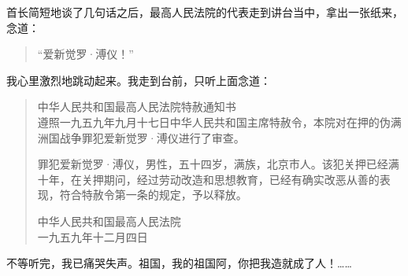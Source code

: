 首长简短地谈了几句话之后，最高人民法院的代表走到讲台当中，拿出一张纸来，念道：\\

\begin{quote}
	“爱新觉罗·溥仪！”\\
\end{quote}

我心里激烈地跳动起来。我走到台前，只听上面念道：\\

\begin{quote}
	中华人民共和国最高人民法院特赦通知书\\

遵照一九五九年九月十七日中华人民共和国主席特赦令，本院对在押的伪满洲国战争罪犯爱新觉罗·溥仪进行了审查。

罪犯爱新觉罗·溥仪，男性，五十四岁，满族，北京市人。该犯关押已经满十年，在关押期问，经过劳动改造和思想教育，已经有确实改恶从善的表现，符合特赦令第一条的规定，予以释放。\\

\begin{flushright}
	中华人民共和国最高人民法院\\

一九五九年十二月四日\\
\end{flushright}
\end{quote}

不等听完，我已痛哭失声。祖国，我的祖国阿，你把我造就成了人！……\\
